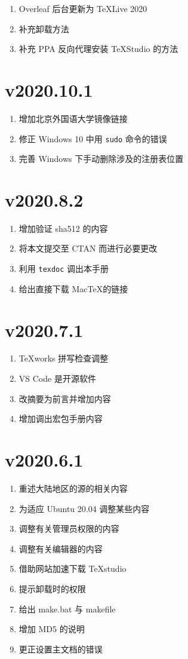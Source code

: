 \begin{enumerate}
  \item Overleaf 后台更新为 \TeX Live 2020
  \item 补充卸载方法
  \item 补充 PPA 反向代理安装 \TeX Studio 的方法
\end{enumerate}

\section*{v2020.10.1}

\begin{enumerate}
  \item 增加北京外国语大学镜像链接
  \item 修正 Windows 10 中用 \texttt{sudo} 命令的错误
  \item 完善 Windows 下手动删除涉及的注册表位置
\end{enumerate}

\section*{v2020.8.2}

\begin{enumerate}
  \item 增加验证 sha512 的内容
  \item 将本文提交至 CTAN 而进行必要更改
  \item 利用 \texttt{texdoc} 调出本手册
  \item 给出直接下载 Mac\TeX 的链接
\end{enumerate}

\section*{v2020.7.1}

\begin{enumerate}
  \item \TeX works 拼写检查调整
  \item VS Code 是开源软件
  \item 改摘要为前言并增加内容
  \item 增加调出宏包手册内容
\end{enumerate}

\section*{v2020.6.1}

\begin{enumerate}
  \item 重述大陆地区的源的相关内容
  \item 为适应 Ubuntu 20.04 调整某些内容
  \item 调整有关管理员权限的内容
  \item 调整有关编辑器的内容
  \item 借助网站加速下载 TeXstudio
  \item 提示卸载时的权限
  \item 给出 make.bat 与 makefile
  \item 增加 MD5 的说明
  \item 更正设置主文档的错误
\end{enumerate}

